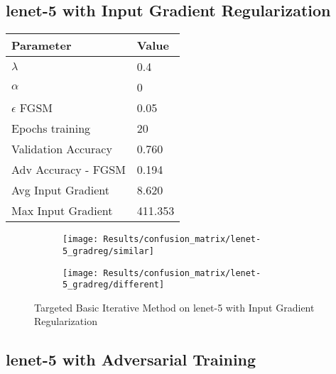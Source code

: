 \documentclass[draft,final]{vutinfth} %
\begin{document}
\subsection{lenet-5 with Input Gradient Regularization}

\begin{table}[h]
  \centering
  \begin{tabular}{ll}
    \toprule
			Parameter			& Value   					\\
    \midrule
			$\lambda$								& 0.4			\\
			$\alpha$								& 0				\\
			$\epsilon$ FGSM					& 0.05		\\
			Epochs training					& 20			\\
			
			Validation Accuracy			& 0.760		\\ 
			Adv Accuracy - FGSM			& 0.194		\\
			
			Avg Input Gradient			& 8.620		\\
			Max Input Gradient			& 411.353	\\
    \bottomrule
  \end{tabular}
\end{table}


\begin{figure}[h]
  \begin{subfigure}[b]{0.5\columnwidth}
		\centering
    \texttt{[image: Results/confusion\_matrix/lenet-5\_gradreg/similar]}
    \label{fig:exp:cm:lenet-5_gradreg:similar}
  \end{subfigure}
  \begin{subfigure}[b]{0.5\columnwidth}
		\centering
    \texttt{[image: Results/confusion\_matrix/lenet-5\_gradreg/different]}
    \label{fig:exp:cm:lenet-5_gradreg:different}
  \end{subfigure}
  \caption{Targeted Basic Iterative Method on lenet-5 with Input Gradient Regularization}
  \label{fig:exp:cm:lenet-5_gradreg}
\end{figure}
\clearpage

\subsection{lenet-5 with Adversarial Training}
\end{document}
